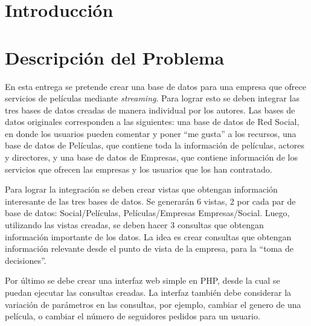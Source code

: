 \documentclass[12pt,letterpaper]{article}
\begin{document}

\newpage
\pagestyle{fancy}
\headheight=60pt 					
\fancyhead[R]
{}
\setcounter{page}{1}
\tableofcontents

\newpage

\section{Introducción}

\section{Descripción del Problema}

En esta entrega se pretende crear una base de datos para una empresa que ofrece servicios de películas mediante \emph{streaming}. Para lograr esto se deben integrar las tres bases de datos creadas de manera individual por los autores. Las bases de datos originales corresponden a las siguientes: una base de datos de Red Social, en donde los usuarios pueden comentar y poner ``me gusta'' a los recursos, una base de datos de Películas, que contiene toda la información de películas, actores y directores, y una base de datos de Empresas, que contiene información de los servicios que ofrecen las empresas y los usuarios que los han contratado.

Para lograr la integración se deben crear vistas que obtengan información interesante de las tres bases de datos. Se generarán 6 vistas, 2 por cada par de base de datos: Social/Películas, Películas/Empresas Empresas/Social. Luego, utilizando las vistas creadas, se deben hacer 3 consultas que obtengan información importante de los datos. La idea es crear consultas que obtengan información relevante desde el punto de vista de la empresa, para la ``toma de decisiones''.

Por último se debe crear una interfaz web simple en PHP, desde la cual se puedan ejecutar las consultas creadas. La interfaz también debe considerar la variación de parámetros en las consultas, por ejemplo, cambiar el genero de una película, o cambiar el número de seguidores pedidos para un usuario. 
\end{document}
